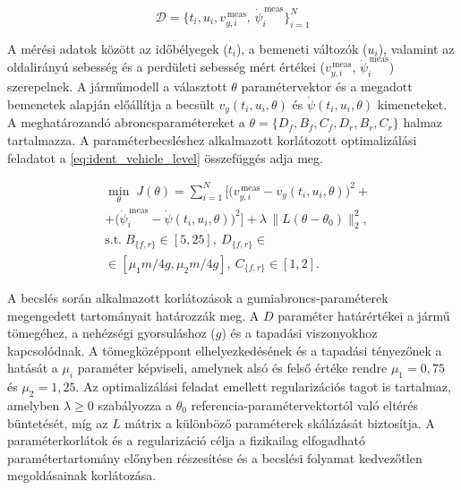 \documentclass[12pt,a4paper,onehalfspacing, oneside]{book} %
\begin{document}
\begin{equation}
	\mathcal{D} = \{t_i, u_i ,v_{y,i}^{\,\text{meas}},\,\dot{\psi}_i^{\,\text{meas}}\}_{i=1}^N
    \label{halmaz}
\end{equation}

A mérési adatok között az időbélyegek ($t_i$), a bemeneti változók ($u_i$), valamint az oldalirányú sebesség és a perdületi sebesség mért értékei ($v_{y,i}^{\,\text{meas}}$, $\dot{\psi}_i^{\,\text{meas}}$) szerepelnek. A járműmodell a választott $\theta$ paramétervektor és a megadott bemenetek alapján előállítja a becsült $v_y(t_i,u_i,\theta)$ és $\dot{\psi}(t_i,u_i,\theta)$ kimeneteket. A meghatározandó abroncsparamétereket a $\theta = \{D_f, B_f, C_f, D_r, B_r, C_r\}$ halmaz tartalmazza. A paraméterbecsléshez alkalmazott korlátozott optimalizálási feladatot a \ref{eq:ident_vehicle_level} összefüggés adja meg.

\begin{subequations}
	\label{eq:ident_vehicle_level}
	\begin{align}
		& \min_{{\theta}}\; J({\theta}) = \sum_{i=1}^N \Big[ \big(v_{y,i}^{\,\text{meas}} - v_y(t_i,u_i, {\theta})\big)^2 +  \nonumber \\ 
		& + \big(\dot{\psi}_i^{\,\text{meas}} - \dot{\psi}(t_i, u_i, {\theta})\big)^2 \Big] +  \lambda\,\|L({\theta}-{\theta}_0)\|_2^2, \nonumber \\
		&  \text{s.t.}\; B_{\{f,r\}} \in [5,25], \: D_{\{f,r\}}\in \nonumber \\ &\in [ \mu_1 m/4 g,  \mu_2 m/4 g], \: C_{\{f,r\}} \in [1,2].
	\end{align}
\end{subequations}

A becslés során alkalmazott korlátozások a gumiabroncs-paraméterek megengedett tartományait határozzák meg. A $D$ paraméter határértékei a jármű tömegéhez, a nehézségi gyorsuláshoz ($g$) és a tapadási viszonyokhoz kapcsolódnak. A tömegközéppont elhelyezkedésének és a tapadási tényezőnek a hatását a $\mu_i$ paraméter képviseli, amelynek alsó és felső értéke rendre $\mu_1 = 0{,}75$ és $\mu_2 = 1{,}25$. Az optimalizálási feladat emellett regularizációs tagot is tartalmaz, amelyben $\lambda \ge 0$ szabályozza a $\theta_0$ referencia-paramétervektortól való eltérés büntetését, míg az $L$ mátrix a különböző paraméterek skálázását biztosítja. A paraméterkorlátok és a regularizáció célja a fizikailag elfogadható paramétertartomány előnyben részesítése és a becslési folyamat kedvezőtlen megoldásainak korlátozása.
\end{document}
